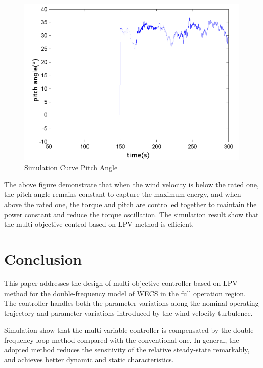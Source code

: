 \documentclass[english]{cccconf}
\begin{document}
\begin{figure}[!htb]
  \centering
  \includegraphics[width=\hsize]{6.png}
  \caption{Simulation Curve Pitch Angle}
  \label{fig6}
\end{figure}

The above figure demonstrate that when the wind velocity is below the
rated one, the pitch angle remains constant to capture the maximum energy,
and when above the rated one, the torque and pitch are controlled together
to maintain the power constant and reduce the torque oscillation. The
simulation result show that the multi-objective control based on LPV
method is efficient.

\section{Conclusion}

This paper addresses the design of multi-objective controller based on LPV
method for the double-frequency model of WECS in the full operation region.
The controller handles both the parameter variations along the nominal
operating trajectory and parameter variations introduced by the wind
velocity turbulence.

Simulation show that the multi-variable controller is compensated by the
double-frequency loop method compared with the conventional one. In general,
the adopted method reduces the sensitivity of the relative steady-state
remarkably, and achieves better dynamic and static characteristics.
\end{document}
